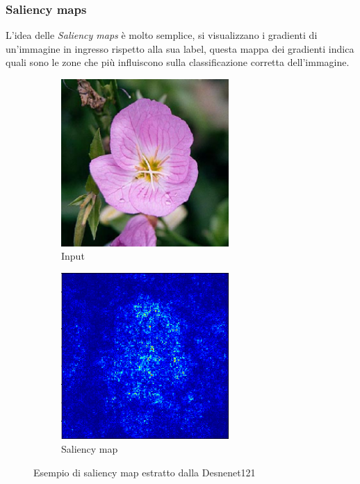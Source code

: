 \subsubsection{Saliency maps}
L'idea delle \textit{Saliency maps} è molto semplice, si visualizzano i gradienti di un'immagine in ingresso rispetto alla sua label, questa mappa dei gradienti indica quali sono le zone che più influiscono sulla classificazione corretta dell'immagine.

\begin{figure}[H]
  \begin{subfigure}[b]{0.45\textwidth}
  \centering
    \includegraphics[width=0.7\textwidth]{images/saliency-input}
    \caption{Input}
  \end{subfigure}
   \hfill
  \begin{subfigure}[b]{0.45\textwidth}
  \centering
    \includegraphics[width=0.7\textwidth]{images/saliency-output}
    \caption{Saliency map}
  \end{subfigure}
  \caption{Esempio di saliency map estratto dalla Desnenet121}
  \label{fig_saliency}
\end{figure}

